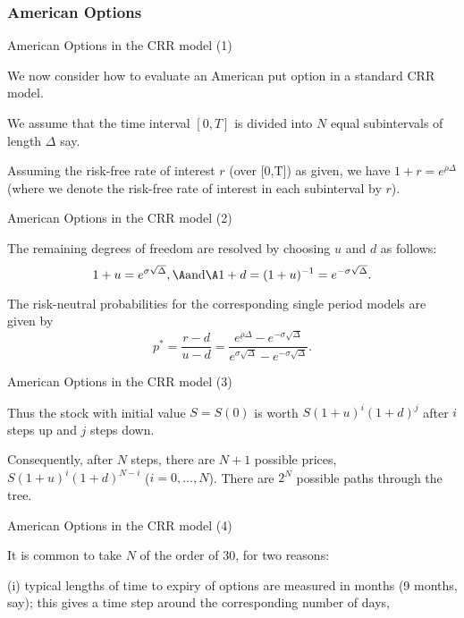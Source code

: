 
\subsubsection{American Options}

{ American Options in the CRR model (1)}


	We now consider how to evaluate an American put option in a
standard CRR model.

	We assume that the time interval $[0,T]$ is
divided into $N$ equal subintervals of length $\Delta $ say.

	Assuming the risk-free rate of interest $r$ (over [0,T]) as given,
we have $1+r = e^{\rho \Delta}$ (where we denote the risk-free
rate of interest in each subinterval by $r$).


{ American Options in the CRR model (2)}


	The remaining
degrees of freedom are resolved by choosing $u$ and $d$ as
follows:
$$
1+u= e^{\sigma \sqrt{\Delta}}, \A \mbox{and} \A 1+d = (1+u)^{-1} =
e^{-\sigma \sqrt{\Delta}}.
$$

The risk-neutral probabilities for
the corresponding single period models are given by
$$
p^*= \frac{r-d}{u-d} = \frac{e^{\rho \Delta}-e^{-\sigma
\sqrt{\Delta}}} {e^{\sigma \sqrt{\Delta}}-e^{-\sigma
\sqrt{\Delta}}}.
$$


{ American Options in the CRR model (3)}


	Thus the stock with initial value $S = S(0)$ is worth $S (1+u)^i
(1+d)^j$ after $i$ steps up and $j$ steps down.

	Consequently,
after $N$ steps, there are $N+1$ possible prices, $S (1+u)^i
(1+d)^{N-i}$ ($i = 0, \ldots, N$). There are $2^N$ possible paths
through the tree.


{ American Options in the CRR model (4)}


	It is common to take $N$ of the order of 30, for
two reasons:


	(i) typical lengths of time to expiry of
options are measured in months (9 months, say); this
gives a time step around the corresponding number of days,

